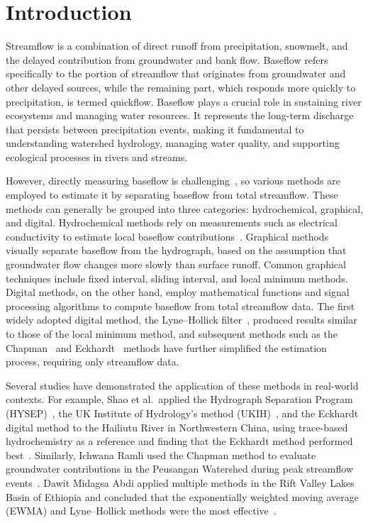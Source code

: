 \documentclass[hydrology,article,submit,pdftex,moreauthors]{Definitions/mdpi}
\begin{document}
\section{Introduction}
\label{sec:introduction}

Streamflow is a combination of direct runoff from precipitation, snowmelt, and the delayed contribution from groundwater and bank flow. Baseflow refers specifically to the portion of streamflow that originates from groundwater and other delayed sources, while the remaining part, which responds more quickly to precipitation, is termed quickflow. Baseflow plays a crucial role in sustaining river ecosystems and managing water resources. It represents the long-term discharge that persists between precipitation events, making it fundamental to understanding watershed hydrology, managing water quality, and supporting ecological processes in rivers and streams.

However, directly measuring baseflow is challenging~\cite{ref1}, so various methods are employed to estimate it by separating baseflow from total streamflow. These methods can generally be grouped into three categories: hydrochemical, graphical, and digital. Hydrochemical methods rely on measurements such as electrical conductivity to estimate local baseflow contributions~\cite{ref2}. Graphical methods visually separate baseflow from the hydrograph, based on the assumption that groundwater flow changes more slowly than surface runoff. Common graphical techniques include fixed interval, sliding interval, and local minimum methods. Digital methods, on the other hand, employ mathematical functions and signal processing algorithms to compute baseflow from total streamflow data. The first widely adopted digital method, the Lyne--Hollick filter~\cite{ref3}, produced results similar to those of the local minimum method, and subsequent methods such as the Chapman~\cite{ref4} and Eckhardt~\cite{ref5} methods have further simplified the estimation process, requiring only streamflow data.

Several studies have demonstrated the application of these methods in real-world contexts. For example, Shao et al.\ applied the Hydrograph Separation Program (HYSEP)~\cite{ref6}, the UK Institute of Hydrology's method (UKIH)~\cite{ref7}, and the Eckhardt digital method to the Hailiutu River in Northwestern China, using trace-based hydrochemistry as a reference and finding that the Eckhardt method performed best~\cite{ref8}. Similarly, Ichwana Ramli used the Chapman method to evaluate groundwater contributions in the Peusangan Watershed during peak streamflow events~\cite{ref9}. Dawit Midagsa Abdi applied multiple methods in the Rift Valley Lakes Basin of Ethiopia and concluded that the exponentially weighted moving average (EWMA) and Lyne--Hollick methods were the most effective~\cite{ref10}.
\end{document}

